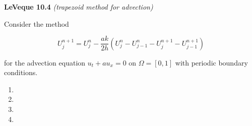\textbf{LeVeque 10.4}  \textit{(trapezoid method for advection)}

Consider the method

$$
U_j^{n+1} = U_{j}^{n} - \frac{ak}{2h} \left( U_j^n  - U_{j-1}^n - U_{j}^{n+1} - U_{j-1}^{n+1} \right)
$$

for the advection equation $u_t + a u_x = 0$ on $\Omega = [0, 1]$ with periodic boundary conditions.

\begin{enumerate}
  \item 
  \pagebreak
  \item 
  \pagebreak
  \item 
  \pagebreak
  \item 
\end{enumerate} 